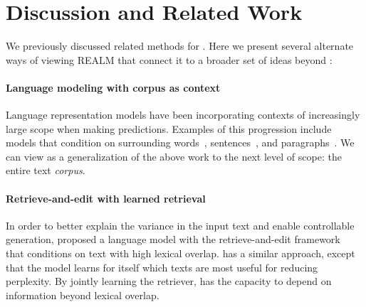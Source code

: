 
\section{Discussion and Related Work}
We previously discussed related methods for \openqa.
Here we present several alternate ways of viewing REALM that connect it to a broader set of ideas beyond \openqa:

\paragraph{Language modeling with corpus as context}
Language representation models have been incorporating contexts of 
increasingly large scope when making predictions.
Examples of this progression include models that condition on surrounding words~\cite{skipgram, word2vec}, sentences~\cite{skipthought, elmo}, and paragraphs~\cite{gpt, bert}. We can view \thename as a generalization of the above work to the next level of scope: the entire text \emph{corpus}. %

\paragraph{Retrieve-and-edit with learned retrieval}
In order to better explain the variance in the input text and enable controllable generation, \citet{prototypes} proposed a language model with the retrieve-and-edit framework~\cite{retrieve_and_edit} that conditions on text with high lexical overlap. \thename has a similar approach, except that the model learns for itself which texts are most useful for reducing perplexity. By jointly learning the retriever, \thename has the capacity to depend on information beyond lexical overlap.

